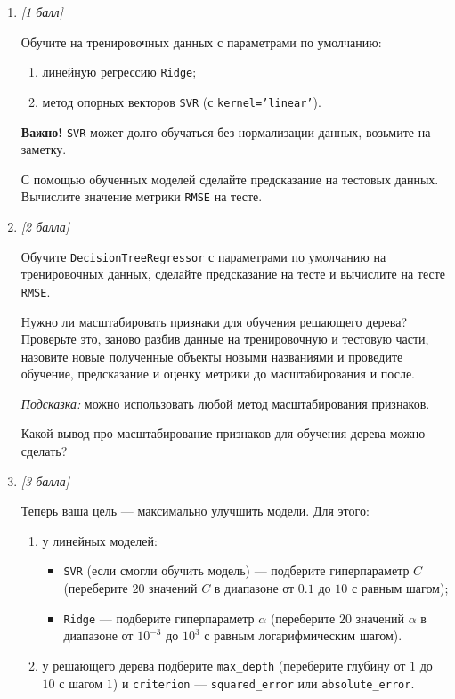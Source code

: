 \begin{enumerate}[label=\textbf{Task \arabic*:}, leftmargin=*]
\item \textit{[1 балл]}

Обучите на тренировочных данных с параметрами по умолчанию:
\begin{enumerate}[label=\arabic*)]
    \item линейную регрессию \texttt{Ridge};
    \item метод опорных векторов \texttt{SVR} (с \texttt{kernel='linear'}).
\end{enumerate}

\textbf{Важно!} \texttt{SVR} может долго обучаться без нормализации данных, возьмите на заметку.

С помощью обученных моделей сделайте предсказание на тестовых данных. Вычислите значение метрики \texttt{RMSE} на тесте.

\item \textit{[2 балла]}

Обучите \texttt{DecisionTreeRegressor} с параметрами по умолчанию на тренировочных данных, сделайте предсказание на тесте и вычислите на тесте \texttt{RMSE}.

Нужно ли масштабировать признаки для обучения решающего дерева? Проверьте это, заново разбив данные на тренировочную и тестовую части, назовите новые полученные объекты новыми названиями и проведите обучение, предсказание и оценку метрики до масштабирования и после.

\textit{Подсказка:} можно использовать любой метод масштабирования признаков.

Какой вывод про масштабирование признаков для обучения дерева можно сделать?

\item \textit{[3 балла]}

Теперь ваша цель --- максимально улучшить модели. Для этого:

\begin{enumerate}[label=\arabic*)]
    \item у линейных моделей:
    \begin{itemize}
        \item \texttt{SVR} (если смогли обучить модель) --- подберите гиперпараметр \(C\) (переберите \(20\) значений \(C\) в диапазоне от \(0.1\) до \(10\) с равным шагом);
        \item \texttt{Ridge} --- подберите гиперпараметр \(\alpha\) (переберите \(20\) значений \(\alpha\) в диапазоне от \(10^{-3}\) до \(10^{3}\) с равным логарифмическим шагом).
    \end{itemize}
    \item у решающего дерева подберите \texttt{max\_depth} (переберите глубину от \(1\) до \(10\) с шагом \(1\)) и \texttt{criterion} --- \texttt{squared\_error} или \texttt{absolute\_error}.
\end{enumerate}


\end{enumerate}
